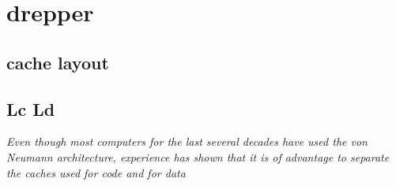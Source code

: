 \section{drepper}
\subsection{cache layout}


\subsection{Lc Ld}
\textit{Even though most computers for the last several decades
	have used the von Neumann architecture, experience has
	shown that it is of advantage to separate the caches used
	for code and for data}
